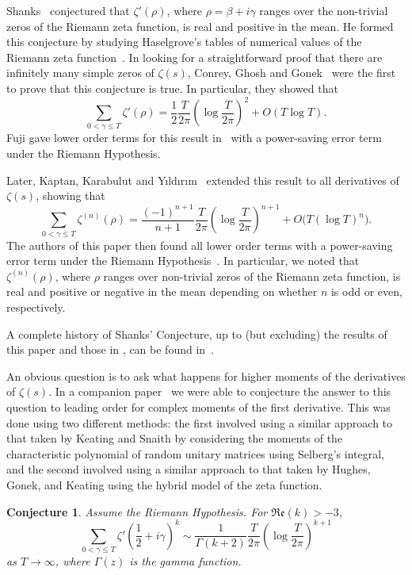 \documentclass[12pt,a4paper,reqno]{amsart}
\newtheorem{conjecture}{Conjecture}
\theoremstyle{remark}
\numberwithin{equation}{section}
\renewcommand{\Re}{\mathfrak{Re}}
\begin{document}
Shanks~\cite{Shanks61} conjectured that $\zeta ' (\rho)$, where $\rho=\beta+ i\gamma$ ranges over the non-trivial zeros of the Riemann zeta function, is real and positive in the mean. He formed this conjecture by studying Haselgrove's tables of numerical values of the Riemann zeta function~\cite{Has60}. In looking for a straightforward proof that there are infinitely many simple zeros of $\zeta (s)$, Conrey, Ghosh and Gonek~\cite{CGG88}
were the first to prove that this conjecture is true. In particular, they showed that
\[
\sum_{0 < \gamma \leq T} \zeta ' (\rho) = \frac{1}{2} \frac{T}{2 \pi} \left( \log \frac{T}{2 \pi} \right)^2 + O(T\log T).
\]
Fuji gave lower order terms for this result in~\cite{Fuj94,Fujii12} with a power-saving error term under the Riemann Hypothesis.

Later, Kaptan, Karabulut and Y{\i}ld{\i}r{\i}m~\cite{KKY11} extended this result to all derivatives of $\zeta (s)$, showing that
\begin{equation*}
	\sum_{0 < \gamma \leq T} \zeta^{(n)} (\rho) =
	\frac{(-1)^{n+1}}{n+1} \frac{T}{2 \pi} \left( \log \frac{T}{2 \pi} \right)^{n+1} + O \bigl(T (\log T)^n \bigr).
\end{equation*}
The authors of this paper then found all lower order terms with a power-saving error term under the Riemann Hypothesis~\cite{HugPC22}. In particular, we noted that $\zeta ^{(n)} (\rho)$, where $\rho$ ranges over non-trivial zeros of the Riemann zeta function, is real and positive or negative in the mean depending on whether $n$ is odd or even, respectively.

A complete history of Shanks' Conjecture, up to (but excluding) the results of this paper and those in \cite{HugPC24}, can be found in~\cite{HMPC24}.

An obvious question is to ask what happens for higher moments of the derivatives of $\zeta (s)$. In a companion paper~\cite{HugPC24} we were able to conjecture the answer to this question to leading order for complex moments of the first derivative. This was done using two different methods: the first involved using a similar approach to that taken by Keating and Snaith \cite{KS00a} by considering the moments of the characteristic polynomial of random unitary matrices using Selberg's integral, and the second involved using a similar approach to that taken by Hughes, Gonek, and Keating \cite{GHK07} using the hybrid model of the zeta function.

\begin{conjecture}\label{conj:n1}
	Assume the Riemann Hypothesis. For $\Re(k)>-3$,
	\begin{equation*}
		\sum_{0 < \gamma \leq T} \zeta' \left( \frac{1}{2} + i \gamma \right)^{k} \sim \frac{1}{\Gamma(k +2)} \frac{T}{2 \pi} \left( \log \frac{T}{2\pi} \right)^{k+1} 
	\end{equation*}
    as $T \to \infty$, where $\Gamma (z)$ is the gamma function.
\end{conjecture}
\end{document}
